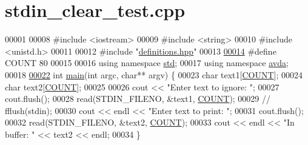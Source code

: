 \hypertarget{stdin__clear__test_8cpp_source}{\section{stdin\+\_\+clear\+\_\+test.\+cpp}
\label{stdin__clear__test_8cpp_source}
}

\begin{DoxyCode}
00001 
00008 \textcolor{preprocessor}{#include <iostream>}
00009 \textcolor{preprocessor}{#include <string>}
00010 \textcolor{preprocessor}{#include <unistd.h>}
00011 
00012 \textcolor{preprocessor}{#include "\hyperlink{definitions_8hpp}{definitions.hpp}"}
00013 
\hypertarget{stdin__clear__test_8cpp_source_l00014}{}\hyperlink{stdin__clear__test_8cpp_a698c124f1c293f98840449d6c5b9d984}{00014} \textcolor{preprocessor}{#define COUNT 80}
00015 
00016 \textcolor{keyword}{using namespace }\hyperlink{namespacestd}{std};
00017 \textcolor{keyword}{using namespace }\hyperlink{namespaceavda}{avda};
00018 
\hypertarget{stdin__clear__test_8cpp_source_l00022}{}\hyperlink{stdin__clear__test_8cpp_a3c04138a5bfe5d72780bb7e82a18e627}{00022} \textcolor{keywordtype}{int} \hyperlink{stdin__clear__test_8cpp_a3c04138a5bfe5d72780bb7e82a18e627}{main}(\textcolor{keywordtype}{int} argc, \textcolor{keywordtype}{char}** argv) \{
00023     \textcolor{keywordtype}{char} text1[\hyperlink{stdin__clear__test_8cpp_a698c124f1c293f98840449d6c5b9d984}{COUNT}];
00024     \textcolor{keywordtype}{char} text2[\hyperlink{stdin__clear__test_8cpp_a698c124f1c293f98840449d6c5b9d984}{COUNT}];
00025 
00026     cout << \textcolor{stringliteral}{"Enter text to ignore: "};
00027     cout.flush();
00028     read(STDIN\_FILENO, &text1, \hyperlink{stdin__clear__test_8cpp_a698c124f1c293f98840449d6c5b9d984}{COUNT});
00029 \textcolor{comment}{//  fflush(stdin);}
00030     cout << endl << \textcolor{stringliteral}{"Enter text to print: "};
00031     cout.flush();
00032     read(STDIN\_FILENO, &text2, \hyperlink{stdin__clear__test_8cpp_a698c124f1c293f98840449d6c5b9d984}{COUNT});
00033     cout << endl << \textcolor{stringliteral}{"In buffer: "} << text2 << endl;
00034 \}
\end{DoxyCode}
